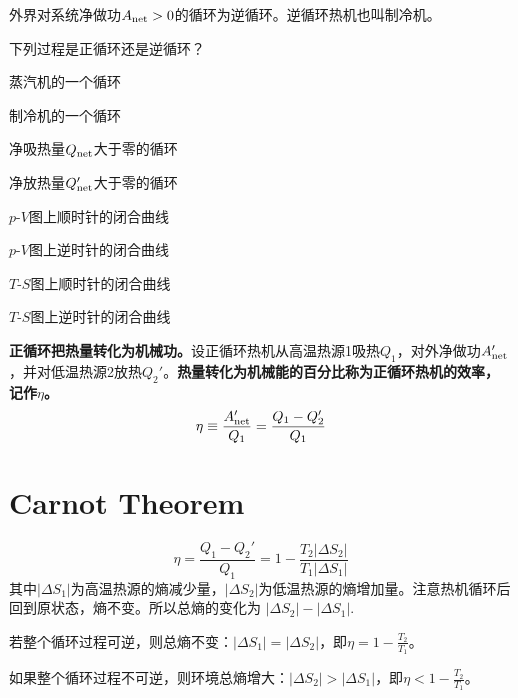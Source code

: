 \documentclass[CJK]{beamer}
\begin{document}
\begin{frame}
\bchL

外界对系统净做功$A_{\rm net}>0$的循环为逆循环。逆循环热机也叫制冷机。

\echL
\end{frame}

\begin{frame}
\bchL
下列过程是正循环还是逆循环？
\bitem
\item{蒸汽机的一个循环}
\item{制冷机的一个循环}
\item{净吸热量$Q_{\rm net}$大于零的循环}
\item{净放热量$Q_{\rm net}'$大于零的循环}
\item{$p$-$V$图上顺时针的闭合曲线}
\item{$p$-$V$图上逆时针的闭合曲线}
\item{$T$-$S$图上顺时针的闭合曲线}
\item{$T$-$S$图上逆时针的闭合曲线}
\eitem
\echL
\end{frame}


\begin{frame}
\bchL



{\bf 正循环把热量转化为机械功。}设正循环热机从高温热源1吸热$Q_1$，对外净做功$A'_{\rm net}$，并对低温热源2放热$Q_2'$。{\bf 热量转化为机械能的百分比称为正循环热机的效率，记作$\eta$。}
$$\eta \equiv \frac{A'_{\rm net}}{Q_1}=\frac{Q_1-Q_2'}{Q_1} $$


\echL
\end{frame}

\section{Carnot Theorem}

\begin{frame}
\bch
{}
$$\eta = \frac{Q_1-Q_2'}{Q_1} = 1-\frac{T_2|\Delta S_2|}{T_1|\Delta S_1|}$$
 其中$|\Delta S_1|$为高温热源的熵减少量，$|\Delta S_2|$为低温热源的熵增加量。注意热机循环后回到原状态，熵不变。所以总熵的变化为 $|\Delta S_2| - |\Delta S_1|$.

 \bitem
 \item{若整个循环过程{\blue 可逆}，则总熵不变：$|\Delta S_1| = |\Delta S_2|$，即{\blue $ \eta = 1 - \frac{T_2}{T_1}$}。}
 \item{如果整个循环过程{\blue 不可逆}，则环境总熵增大：$|\Delta S_2| > |\Delta S_1|$，即{\blue $\eta < 1 - \frac{T_2}{T_1} $}。}
   \eitem

\ech
\end{frame}
\end{document}
